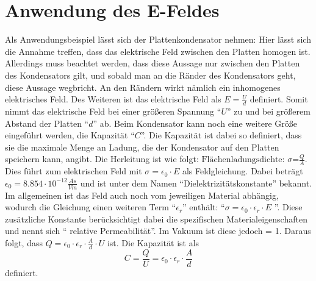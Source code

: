 \section{Anwendung des E-Feldes}
\label{sec:Plattenkondensator}
Als Anwendungsbeispiel lässt sich der Plattenkondensator nehmen:
Hier lässt sich die Annahme treffen, dass das elektrische Feld zwischen den Platten homogen ist.
Allerdings muss beachtet werden, dass diese Aussage nur zwischen den Platten des Kondensators gilt, und sobald man an die Ränder des Kondensators geht, diese Aussage wegbricht.
An den Rändern wirkt nämlich ein inhomogenes elektrisches Feld.
Des Weiteren ist das elektrische Feld als $E = \frac{U}{d}$ definiert.
Somit nimmt das elektrische Feld bei einer größeren Spannung "`$U$"' zu und bei größerem Abstand der Platten "`$d$"' ab.
Beim Kondensator kann noch eine weitere Größe eingeführt werden, die Kapazität "`$C$"'.
Die Kapazität ist dabei so definiert, dass sie die maximale Menge an Ladung, die der Kondensator auf den Platten speichern kann, angibt.
Die Herleitung ist wie folgt:
$\mbox{Flächenladungsdichte: } \sigma \mbox{=} \frac{Q}{A}$.
Dies führt zum elektrischen Feld mit $\sigma = \epsilon_0 \cdot E$ als Feldgleichung.
Dabei beträgt $\epsilon_0 = 8.854 \cdot 10^{-12} \frac{As}{Vm}$ und ist unter dem Namen "`Dielektrizitätskonstante"' bekannt.
Im allgemeinen ist das Feld auch noch vom jeweiligen Material abhängig, wodurch die Gleichung einen weiteren Term "`$\epsilon_r$"' enthält: "`$\sigma = \epsilon_0 \cdot \epsilon_r \cdot E$ "'.
Diese zusätzliche Konstante berücksichtigt dabei die spezifischen Materialeigenschaften und nennt sich "` relative Permeabilität"'.
Im Vakuum ist diese jedoch = 1.
Daraus folgt, dass $ Q = \epsilon_0 \cdot \epsilon_r \cdot \frac{A}{d} \cdot U$ ist.
Die Kapazität ist als
\begin{equation}
\label{eq:C}
    C = \frac{Q}{U} = \epsilon_0 \cdot \epsilon_r \cdot \frac{A}{d}
\end{equation}
definiert.
